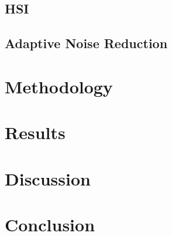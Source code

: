 \documentclass{article}
\begin{document}
\subsection*{HSI}


\subsection*{Adaptive Noise Reduction}




\pagebreak

\section{Methodology}

%
%




\pagebreak

\section{Results}

%


\pagebreak

\section{Discussion}

%
%

\pagebreak

\section{Conclusion}

%
%
\end{document}
